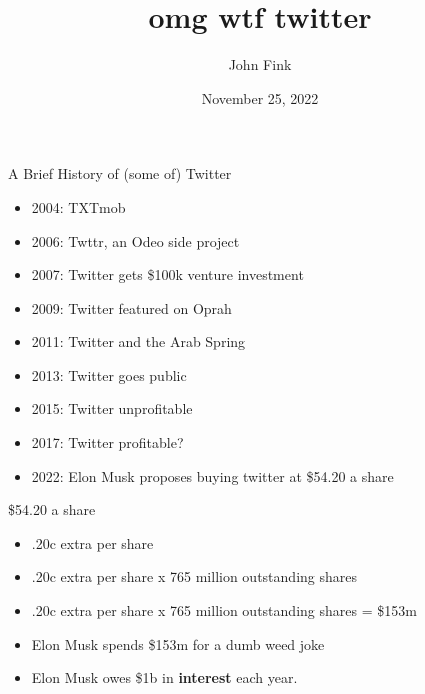\documentclass{beamer}
\title{omg wtf twitter}
\author{John Fink}
\date{November 25, 2022}
\begin{document}
\begin{frame}[plain]
    \maketitle
\end{frame}
\begin{frame}{A Brief History of (some of) Twitter}
	\begin{itemize}
		\pause
		\item 2004: TXTmob
		\pause
		\item 2006: Twttr, an Odeo side project
		\pause
		\item 2007: Twitter gets \$100k venture investment
		\pause
		\item 2009: Twitter featured on Oprah
		\pause
		\item 2011: Twitter and the Arab Spring
		\pause
		\item 2013: Twitter goes public
		\pause 
		\item 2015: Twitter unprofitable
		\pause
		\item 2017: Twitter profitable?
		\pause
		\item 2022: Elon Musk proposes buying twitter at \$54.20 a share
	\end{itemize}
\end{frame}

\begin{frame}{\$54.20 a share}
	\begin{itemize}
		\pause
		\item .20c extra per share
		\pause
		\item .20c extra per share x 765 million outstanding shares
		\pause
		\item .20c extra per share x 765 million outstanding shares = \$153m
		\pause
		\item Elon Musk spends \$153m for a dumb weed joke
		\pause 
		\item Elon Musk owes \$1b in \textbf{interest} each year.
	\end{itemize}	
\end{frame}
\end{document}
